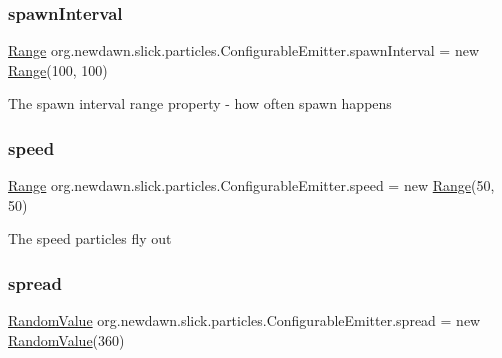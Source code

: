 \subsubsection{\texorpdfstring{spawn\+Interval}{spawnInterval}}
{\footnotesize\ttfamily \mbox{\hyperlink{classorg_1_1newdawn_1_1slick_1_1particles_1_1_configurable_emitter_1_1_range}{Range}} org.\+newdawn.\+slick.\+particles.\+Configurable\+Emitter.\+spawn\+Interval = new \mbox{\hyperlink{classorg_1_1newdawn_1_1slick_1_1particles_1_1_configurable_emitter_1_1_range}{Range}}(100, 100)}

The spawn interval range property -\/ how often spawn happens \mbox{\label{classorg_1_1newdawn_1_1slick_1_1particles_1_1_configurable_emitter_a6d3e6cc37237d2e5518ce645bfb53802}} 
\subsubsection{\texorpdfstring{speed}{speed}}
{\footnotesize\ttfamily \mbox{\hyperlink{classorg_1_1newdawn_1_1slick_1_1particles_1_1_configurable_emitter_1_1_range}{Range}} org.\+newdawn.\+slick.\+particles.\+Configurable\+Emitter.\+speed = new \mbox{\hyperlink{classorg_1_1newdawn_1_1slick_1_1particles_1_1_configurable_emitter_1_1_range}{Range}}(50, 50)}

The speed particles fly out \mbox{\label{classorg_1_1newdawn_1_1slick_1_1particles_1_1_configurable_emitter_a78691f0f94c650977b977d7c7e449d1f}} 
\subsubsection{\texorpdfstring{spread}{spread}}
{\footnotesize\ttfamily \mbox{\hyperlink{classorg_1_1newdawn_1_1slick_1_1particles_1_1_configurable_emitter_1_1_random_value}{Random\+Value}} org.\+newdawn.\+slick.\+particles.\+Configurable\+Emitter.\+spread = new \mbox{\hyperlink{classorg_1_1newdawn_1_1slick_1_1particles_1_1_configurable_emitter_1_1_random_value}{Random\+Value}}(360)}

